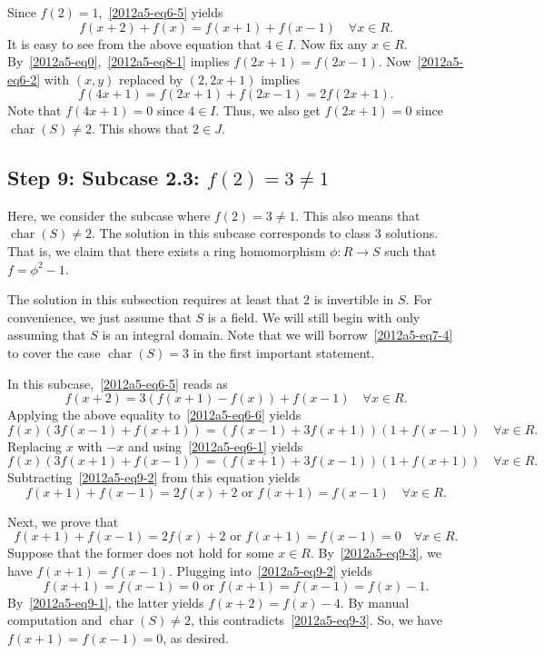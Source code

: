 \documentclass{article}
\DeclareMathOperator{\rchar}{char}
\begin{document}
Since $f(2) = 1$,~\eqref{2012a5-eq6-5} yields
\[ f(x + 2) + f(x) = f(x + 1) + f(x - 1) \quad \forall x \in R. \tag{8.1}\label{2012a5-eq8-1} \]
It is easy to see from the above equation that $4 \in I$.
Now fix any $x \in R$.
By~\eqref{2012a5-eq0},~\eqref{2012a5-eq8-1} implies $f(2x + 1) = f(2x - 1)$.
Now~\eqref{2012a5-eq6-2} with $(x, y)$ replaced by $(2, 2x + 1)$ implies
\[ f(4x + 1) = f(2x + 1) + f(2x - 1) = 2 f(2x + 1). \]
Note that $f(4x + 1) = 0$ since $4 \in I$.
Thus, we also get $f(2x + 1) = 0$ since $\rchar(S) \neq 2$.
This shows that $2 \in J$.









\subsection*{Step 9: Subcase 2.3: $f(2) = 3 \neq 1$}

Here, we consider the subcase where $f(2) = 3 \neq 1$.
This also means that $\rchar(S) \neq 2$.
The solution in this subcase corresponds to class 3 solutions.
That is, we claim that there exists a ring homomorphism $\phi : R \to S$ such that $f = \phi^2 - 1$.

The solution in this subsection requires at least that $2$ is invertible in $S$.
For convenience, we just assume that $S$ is a field.
We will still begin with only assuming that $S$ is an integral domain.
Note that we will borrow~\eqref{2012a5-eq7-4} to cover the case $\rchar(S) = 3$ in the first important statement.

In this subcase,~\eqref{2012a5-eq6-5} reads as
\[ f(x + 2) = 3 (f(x + 1) - f(x)) + f(x - 1) \quad \forall x \in R. \tag{9.1}\label{2012a5-eq9-1} \]
Applying the above equality to~\eqref{2012a5-eq6-6} yields
\[ f(x) (3 f(x - 1) + f(x + 1)) = (f(x - 1) + 3 f(x + 1)) (1 + f (x - 1)) \quad \forall x \in R. \tag{9.2}\label{2012a5-eq9-2} \]
Replacing $x$ with $-x$ and using~\eqref{2012a5-eq6-1} yields
\[ f(x) (3 f(x + 1) + f(x - 1)) = (f(x + 1) + 3 f(x - 1)) (1 + f (x + 1)) \quad \forall x \in R. \]
Subtracting~\eqref{2012a5-eq9-2} from this equation yields
\[ f(x + 1) + f(x - 1) = 2 f(x) + 2 \text{ or } f(x + 1) = f(x - 1) \quad \forall x \in R. \tag{9.3}\label{2012a5-eq9-3} \]

Next, we prove that
\[ f(x + 1) + f(x - 1) = 2 f(x) + 2 \text{ or } f(x + 1) = f(x - 1) = 0 \quad \forall x \in R. \tag{9.4}\label{2012a5-eq9-4} \]
Suppose that the former does not hold for some $x \in R$.
By~\eqref{2012a5-eq9-3}, we have $f(x + 1) = f(x - 1)$.
Plugging into~\eqref{2012a5-eq9-2} yields
\[ f(x + 1) = f(x - 1) = 0 \text{ or } f(x + 1) = f(x - 1) = f(x) - 1. \]
By~\eqref{2012a5-eq9-1}, the latter yields $f(x + 2) = f(x) - 4$.
By manual computation and $\rchar(S) \neq 2$, this contradicts~\eqref{2012a5-eq9-3}.
So, we have $f(x + 1) = f(x - 1) = 0$, as desired.
\end{document}
